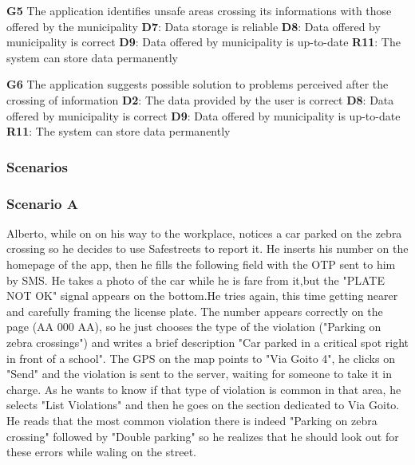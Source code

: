 \begin{outline}

    \1 \textbf{G5} The application identifies unsafe areas crossing 
    its informations with those offered by the municipality
    \2 \textbf{D7}: Data storage is reliable
    \2 \textbf{D8}: Data offered by municipality is correct
    \2 \textbf{D9}: Data offered by municipality is up-to-date
    \2 \textbf{R11}: The system can store data permanently 


    \1 \textbf{G6} The application suggests possible solution to 
    problems perceived after the crossing of information
    \2 \textbf{D2}: The data provided by the user is correct
    \2 \textbf{D8}: Data offered by municipality is correct
    \2 \textbf{D9}: Data offered by municipality is up-to-date
    \2 \textbf{R11}: The system can store data permanently 


\end{outline}

\subsubsection{Scenarios}

\subsubsection*{Scenario A}

Alberto, while on on his way to the workplace, notices a car parked 
on the zebra crossing so he decides to use Safestreets to report it. 
He inserts his number on the homepage of the app, then he fills the 
following field with the OTP sent to him by SMS. He takes a photo of 
the car while he is fare from it,but the "PLATE NOT OK" signal appears 
on the bottom.He tries again, this time getting nearer and carefully 
framing the license plate. The number appears correctly on the page 
(AA 000 AA), so he just chooses the type of the violation ("Parking on 
zebra crossings") and writes a brief description "Car parked in a critical 
spot right in front of a school". The GPS on the map points to "Via Goito 4", 
he clicks on "Send" and the violation is sent to the server, waiting for someone 
to take it in charge.
As he wants to know if that type of violation is common in that area, he selects 
"List Violations" and then he goes on the section dedicated to Via Goito. He 
reads that the most common violation there is indeed "Parking on zebra crossing" 
followed by "Double parking" so he realizes that he should look out for these 
errors while waling on the street.

